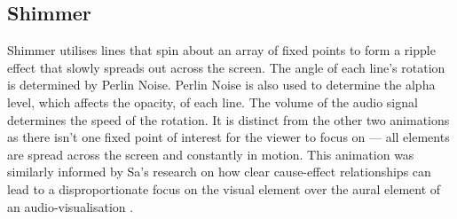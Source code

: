 \documentclass[../initial_thesis.tex]{subfiles}
\begin{document}
\subsection{Shimmer}
Shimmer utilises lines that spin about an array of fixed points to form a ripple effect that slowly spreads out across the screen. The angle of each line's rotation is determined by Perlin Noise. Perlin Noise is also used to determine the alpha level, which affects the opacity, of each line. The volume of the audio signal determines the speed of the rotation. It is distinct from the other two animations as there isn't one fixed point of interest for the viewer to focus on --- all elements are spread across the screen and constantly in motion. This animation was similarly informed by Sa's research on how clear cause-effect relationships can lead to a disproportionate focus on the visual element over the aural element of an audio-visualisation \cite{Sa2014}.
\end{document}
